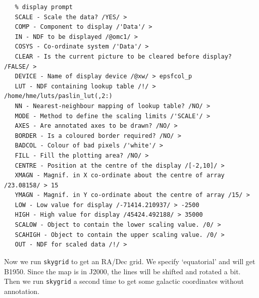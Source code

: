 \documentclass[11pt]{article}
\begin{document}
\begin{verbatim}
   % display prompt
   SCALE - Scale the data? /YES/ >
   COMP - Component to display /'Data'/ >
   IN - NDF to be displayed /@omc1/ >
   COSYS - Co-ordinate system /'Data'/ >
   CLEAR - Is the current picture to be cleared before display? /FALSE/ >
   DEVICE - Name of display device /@xw/ > epsfcol_p
   LUT - NDF containing lookup table /!/ > /home/hme/luts/paslin_lut(,2:)
   NN - Nearest-neighbour mapping of lookup table? /NO/ >
   MODE - Method to define the scaling limits /'SCALE'/ >
   AXES - Are annotated axes to be drawn? /NO/ >
   BORDER - Is a coloured border required? /NO/ >
   BADCOL - Colour of bad pixels /'white'/ >
   FILL - Fill the plotting area? /NO/ >
   CENTRE - Position at the centre of the display /[-2,10]/ >
   XMAGN - Magnif. in X co-ordinate about the centre of array /23.08158/ > 15
   YMAGN - Magnif. in Y co-ordinate about the centre of array /15/ >
   LOW - Low value for display /-71414.210937/ > -2500
   HIGH - High value for display /45424.492188/ > 35000
   SCALOW - Object to contain the lower scaling value. /0/ >
   SCAHIGH - Object to contain the upper scaling value. /0/ >
   OUT - NDF for scaled data /!/ >
\end{verbatim}

   Now we run {\tt skygrid} to get an RA/Dec grid. We specify
   `equatorial' and will get B1950. Since the map is in J2000, the lines
   will be shifted and rotated a bit. Then we run {\tt skygrid} a
   second time to get some galactic coordinates without annotation.
\end{document}
